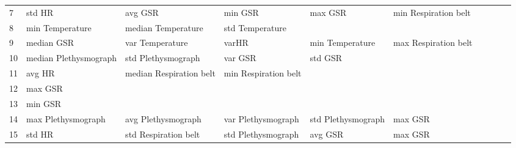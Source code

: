 \begin{landscape}
\begin{table}[]
\begin{tabular}{l|llllllll}
7        & std HR                  & avg GSR                 & min GSR                 & max GSR                 & min Respiration belt    &                       &                         &                         &                         &         \\
8        & min Temperature         & median Temperature      & std Temperature         &                         &                         &                       &                         &                         &                         &         \\
9        & median GSR              & var Temperature         & varHR                   & min Temperature         & max Respiration belt    &                       &                         &                         &                         &         \\
10       & median Plethysmograph   & std Plethysmograph      & var GSR                 & std GSR                 &                         &                       &                         &                         &                         &         \\
11       & avg HR                  & median Respiration belt & min Respiration belt    &                         &                         &                       &                         &                         &                         &         \\
12       & max GSR                 &                         &                         &                         &                         &                       &                         &                         &                         &         \\
13       & min GSR                 &                         &                         &                         &                         &                       &                         &                         &                         &         \\
14       & max Plethysmograph      & avg Plethysmograph      & var Plethysmograph      & std Plethysmograph      & max GSR                 &                       &                         &                         &                         &         \\
15       & std HR                  & std Respiration belt    & std Plethysmograph      & avg GSR                 & max GSR                 &                       &                         &                         &                         &         \\

\end{tabular}
\end{table}
\end{landscape}
